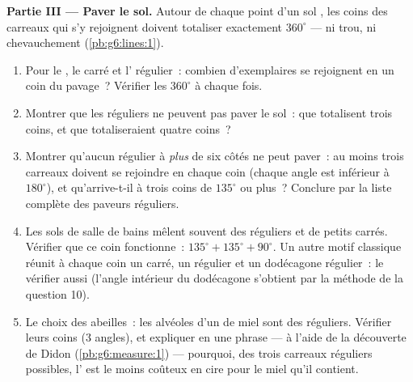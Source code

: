 \begin{problem}
\medskip
\noindent\textbf{Partie III --- Paver le sol.}
Autour de chaque point d'un sol , les coins des carreaux qui s'y
rejoignent doivent totaliser exactement $360^\circ$ --- ni trou, ni
chevauchement (\cref{pb:g6:lines:1}).
\begin{enumerate}[resume]
  \item Pour le , le carré et l'
        régulier~: combien d'exemplaires se rejoignent en un coin du
        pavage~? Vérifier les $360^\circ$ à chaque fois.
  \item Montrer que les  réguliers ne peuvent pas paver le
        sol~: que totalisent trois coins, et que totaliseraient
        quatre coins~?
  \item Montrer qu'aucun  régulier à \emph{plus} de six
        côtés ne peut paver~: au moins trois carreaux doivent se
        rejoindre en chaque coin (chaque angle est inférieur à
        $180^\circ$), et qu'arrive-t-il à trois coins de $135^\circ$
        ou plus~? Conclure par la liste complète des paveurs
        réguliers.
  \item Les sols de salle de bains mêlent souvent des 
        réguliers et de petits carrés. Vérifier que ce coin
        fonctionne~: $135^\circ + 135^\circ + 90^\circ$. Un autre
        motif classique réunit à chaque coin un carré, un 
        régulier et un dodécagone régulier~: le vérifier aussi
        (l'angle intérieur du dodécagone s'obtient par la méthode de
        la question 10).
  \item Le choix des abeilles~: les alvéoles d'un  de miel sont
        des  réguliers. Vérifier leurs coins ($3$ angles),
        et expliquer en une phrase --- à l'aide de la découverte de
        Didon (\cref{pb:g6:measure:1}) --- pourquoi, des trois
        carreaux réguliers possibles, l' est le moins coûteux
        en cire pour le miel qu'il contient.
\end{enumerate}
\end{problem}
